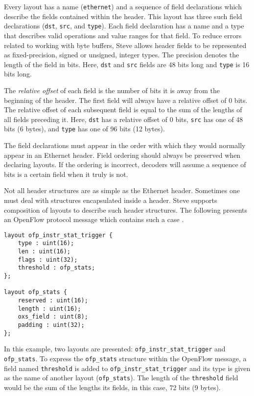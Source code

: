 Every layout has a name (\texttt{ethernet}) and a sequence of field declarations
which describe the fields contained within the header.
This layout has three such field declarations (\texttt{dst}, \texttt{src},
and \texttt{type}).
Each field declaration has a name and a type that describes valid operations and
value ranges for that field.
To reduce errors related to working with byte buffers, Steve allows header fields to
be represented as fixed-precision, signed or unsigned, integer types.
The precision denotes the length of the field in bits.
Here, \texttt{dst} and \texttt{src} fields are 48 bits long and \texttt{type} is
16 bits long.

The \textit{relative offset} of each field is the number of bits it is away
from the beginning of the header. The first field will always have a relative
offset of 0 bits. The relative offset of each subsequent field is equal to the
sum of the lengths of all fields preceding it. Here, \texttt{dst} has a relative
offset of 0 bits, \texttt{src} has one of 48 bits (6 bytes), and \texttt{type} has one of
96 bits (12 bytes).

The field declarations must appear in the order with which they would normally appear
in an Ethernet header. Field ordering should always be
preserved when declaring layouts. If the ordering is incorrect, decoders will
assume a sequence of bits is a certain field when it truly is not. 

Not all header structures are as simple as the Ethernet header. Sometimes one
must deal with structures encapsulated inside a header. Steve supports composition of layouts to describe such header structures.
The following presents an OpenFlow protocol message which contains such a case \cite{openflow_spec}.

\begin{codepage}
\begin{lstlisting}
layout ofp_instr_stat_trigger {
	type : uint(16); 
	len : uint(16); 
	flags : uint(32); 
	threshold : ofp_stats;
};

layout ofp_stats {
	reserved : uint(16); 
	length : uint(16); 
	oxs_field : uint(8);
	padding : uint(32);
};
\end{lstlisting}
\end{codepage}

In this example, two layouts are presented: \texttt{ofp\_instr\_stat\_trigger} and \texttt{ofp\_stats}. 
To express the \texttt{ofp\_stats} structure within the OpenFlow message, a field named \texttt{threshold} is added to
\texttt{ofp\_instr\_stat\_trigger} and its type is given as the name of another layout (\texttt{ofp\_stats}). The length of the \texttt{threshold} field would be the sum of the lengths
its fields, in this case, 72 bits (9 bytes).

